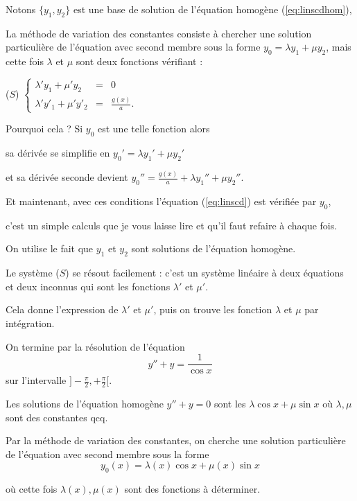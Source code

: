 \change

Notons $\{y_1,y_2\}$ est une base de solution de l'équation homogène (\ref{eq:linscdhom}),

\change
La méthode de variation des constantes consiste à chercher 
une solution particulière de l'équation avec second membre sous la forme 
$y_0= \lambda y_1 + \mu y_2$, mais cette fois $\lambda$ et $\mu$ sont deux fonctions 
vérifiant :

($S$) \qquad $
\left\{\begin{array}{ccl}  
\lambda'y_1+\mu'y_2&=&0\\ 
\lambda'y'_1+\mu'y'_2&=& \frac{g(x)}{a}.
\end{array}\right. 
$


\change

Pourquoi cela ?
Si $y_0$ est une telle fonction alors

sa dérivée se simplifie en 
$y_0' = \lambda y_1'+ \mu y_2'$

et sa dérivée seconde devient 
$y_0'' = \frac{g(x)}{a} + \lambda y_1''+ \mu y_2''$.

\change
Et maintenant, avec ces conditions l'équation (\ref{eq:linscd}) est vérifiée par $y_0$,

c'est un simple calculs que je vous laisse lire et qu'il faut refaire à chaque fois.


On utilise le fait que $y_1$ et $y_2$ sont solutions de l'équation homogène.

\change
Le système ($S$) se résout facilement :
c'est un système linéaire à deux équations et deux inconnus qui sont les fonctions $\lambda'$ et $\mu'$.

Cela donne l'expression de $\lambda'$ et $\mu'$, 
puis on trouve les fonction $\lambda$ et $\mu$ par intégration.


\diapo

On termine par la résolution de l'équation 
$$y'' + y = \frac{1}{\cos x}$$
sur l'intervalle $]-\frac\pi2,+\frac\pi2[$.


\change
Les solutions de l'équation homogène $y'' + y =0$ sont
les 
$\lambda \cos x  + \mu \sin x$ où $\lambda,\mu$ sont des constantes qcq.

\change
Par la méthode de variation des constantes, on cherche une solution 
particulière de l'équation avec second membre sous la forme
$$y_0(x) =\lambda(x) \cos x  + \mu(x) \sin x$$

\change
où cette fois $\lambda(x),\mu(x)$ sont des fonctions à déterminer.

